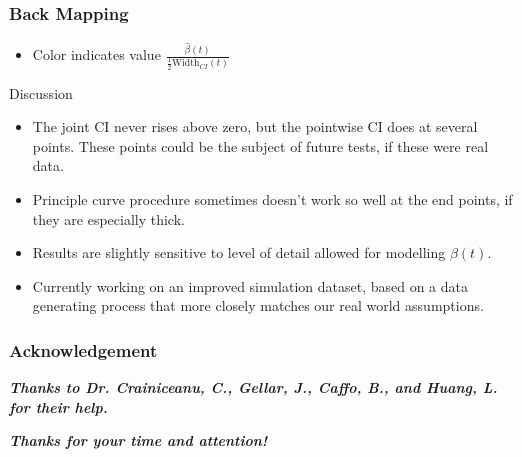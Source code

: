 \documentclass[9 pt]{beamer}
\newcommand{\bi}{\begin{itemize}}
\newcommand{\ei}{\end{itemize}}
\begin{document}
\begin{frame}
\frametitle{Back Mapping}
\begin{figure}[ht]
\centering
{}
\end{figure}
\begin{itemize}
\item<2-| alert@2> Color indicates value $\frac{\hat{\beta}(t)}{\frac{1}{2}\text{Width}_{CI}(t)}$
\end{itemize}
\end{frame}
\begin{frame}{Discussion}
\bi
\item<1-| alert@1> The joint CI never rises above zero, but the pointwise CI does at several points. These points could be the subject of future tests, if these were real data. 
\item<2-| alert@2> Principle curve procedure sometimes doesn't work so well at the end points, if they are especially thick.
\item<2-| alert@2> Results are slightly sensitive to level of detail allowed for modelling $\beta(t)$.
\item<3-| alert@3> Currently working on an improved simulation dataset, based on a data generating process that more closely matches our real world assumptions.
\ei
\end{frame}

\begin{frame}
\frametitle{Acknowledgement}
{\bf\it Thanks to Dr. Crainiceanu, C., Gellar, J., Caffo, B., and Huang, L. for their help.}\\
\smallskip

{\bf\it Thanks for your time and attention!}
\end{frame}
\end{document}
